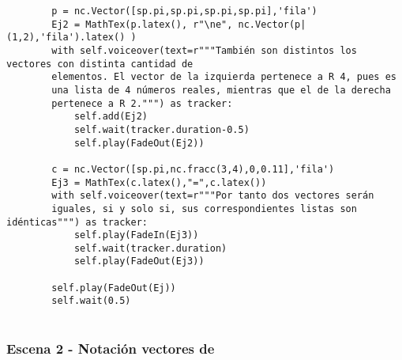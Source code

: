\documentclass[11pt]{article}
\begin{document}
\begin{verbatim}
        p = nc.Vector([sp.pi,sp.pi,sp.pi,sp.pi],'fila')
        Ej2 = MathTex(p.latex(), r"\ne", nc.Vector(p|(1,2),'fila').latex() )
        with self.voiceover(text=r"""También son distintos los vectores con distinta cantidad de
        elementos. El vector de la izquierda pertenece a R 4, pues es
        una lista de 4 números reales, mientras que el de la derecha
        pertenece a R 2.""") as tracker:
            self.add(Ej2)
            self.wait(tracker.duration-0.5)
            self.play(FadeOut(Ej2))
	
        c = nc.Vector([sp.pi,nc.fracc(3,4),0,0.11],'fila')
        Ej3 = MathTex(c.latex(),"=",c.latex())
        with self.voiceover(text=r"""Por tanto dos vectores serán
        iguales, si y solo si, sus correspondientes listas son idénticas""") as tracker:
            self.play(FadeIn(Ej3))
            self.wait(tracker.duration)
            self.play(FadeOut(Ej3))
            
        self.play(FadeOut(Ej))
        self.wait(0.5)
        
\end{verbatim}

\subsubsection{Escena 2 - Notación vectores de \R[n]}
\label{sec:org7f7ce5d}
\end{document}
